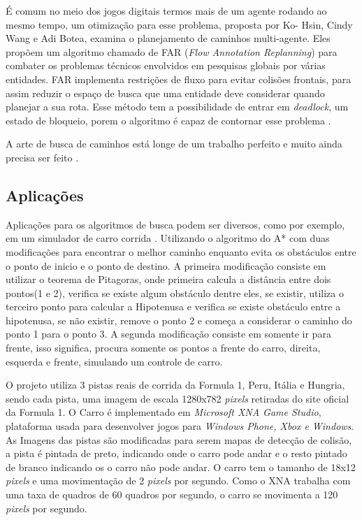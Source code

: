 É comum no meio dos jogos digitais termos mais de um agente rodando ao mesmo tempo, um otimização para esse problema, proposta por Ko- Hsin, Cindy Wang e Adi Botea, examina o planejamento de caminhos multi-agente. Eles propõem um algoritmo chamado de FAR (\textit{Flow Annotation Replanning}) para combater os problemas técnicos envolvidos em pesquisas globais por várias entidades.
FAR implementa restrições de fluxo para evitar colisões frontais, para assim reduzir o espaço de busca que uma entidade deve considerar quando planejar a sua rota. Esse método tem a possibilidade de entrar em \textit{deadlock}, um estado de bloqueio, porem o algoritmo é capaz de contornar esse problema \cite{Ko-hsin}.

A arte de busca de caminhos está longe de um trabalho perfeito e muito ainda precisa ser feito \cite{Pontevia}.

\subsection{Aplicações}
Aplicações para os algoritmos de busca podem ser diversos, como por exemplo, em um simulador de carro corrida \cite{JungTing}. Utilizando o algoritmo do A* com duas modificações para encontrar o melhor caminho enquanto evita os obstáculos entre o ponto de inicio e o ponto de destino. 
A primeira modificação consiste em utilizar o teorema de Pitagoras, onde primeira calcula a distância entre dois pontos(1 e 2), verifica se existe algum obstáculo dentre eles, se existir, utiliza o terceiro ponto para calcular a Hipotenusa e verifica se existe obstáculo entre a hipotenusa, se não existir, remove o ponto 2 e começa a considerar o caminho do ponto 1 para o ponto 3. A segunda modificação consiste em somente ir para frente, isso significa, procura somente os pontos a frente do carro, direita, esquerda e frente, simulando um controle de carro.

O projeto utiliza 3 pistas reais de corrida da Formula 1, Peru, Itália e Hungria, sendo cada pista, uma imagem de escala 1280x782 \textit{pixels} retiradas do site oficial da Formula 1. O Carro é implementado em \textit{Microsoft XNA Game Studio}, plataforma usada para desenvolver jogos para \textit{Windows Phone, Xbox e Windows}. As Imagens das pistas são modificadas para serem mapas de detecção de colisão, a pista é pintada de preto, indicando onde o carro pode andar e o resto pintado de branco indicando os o carro não pode andar. O carro tem o tamanho de 18x12 \textit{pixels} e uma movimentação de 2 \textit{pixels} por segundo. Como o XNA trabalha com uma taxa de quadros de 60 quadros por segundo, o carro se movimenta a 120 \textit{pixels} por segundo.

